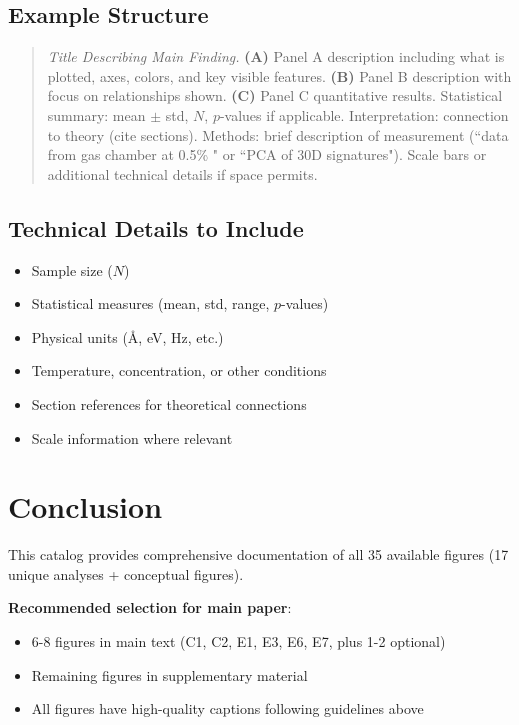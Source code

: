 \documentclass[11pt]{article}
\begin{document}
\subsection{Example Structure}

\begin{quote}
\textit{Title Describing Main Finding.} \textbf{(A)} Panel A description including what is plotted, axes, colors, and key visible features. \textbf{(B)} Panel B description with focus on relationships shown. \textbf{(C)} Panel C quantitative results. Statistical summary: mean $\pm$ std, $N$, $p$-values if applicable. Interpretation: connection to theory (cite sections). Methods: brief description of measurement (``data from gas chamber at 0.5\% " or ``PCA of 30D signatures"). Scale bars or additional technical details if space permits.
\end{quote}

\subsection{Technical Details to Include}

\begin{itemize}
\item Sample size ($N$)
\item Statistical measures (mean, std, range, $p$-values)
\item Physical units (Å, eV, Hz, etc.)
\item Temperature, concentration, or other conditions
\item Section references for theoretical connections
\item Scale information where relevant
\end{itemize}

\section{Conclusion}

This catalog provides comprehensive documentation of all 35 available figures (17 unique analyses + conceptual figures). 

\textbf{Recommended selection for main paper}:
\begin{itemize}
\item 6-8 figures in main text (C1, C2, E1, E3, E6, E7, plus 1-2 optional)
\item Remaining figures in supplementary material
\item All figures have high-quality captions following guidelines above
\end{itemize}
\end{document}
